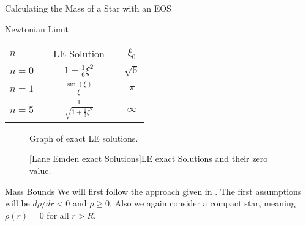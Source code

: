\begin{section}{Calculating the Mass of a Star with an EOS}
\begin{subsection}{Newtonian Limit}
\begin{minipage}{0.45\textwidth}
\begin{tabular}[b]{@{}lcccc@{}}
		\toprule
		$n$ & \phantom{abcd} & \ac{LE} Solution & \phantom{abcd} & $\xi_0$\\
		\cmidrule{1-5}
		$n=0$ && $\displaystyle 1-\frac{1}{6}\xi^2$ && $\sqrt{6}$\\[3ex]
		$n=1$ && $\displaystyle \frac{\sin(\xi)}{\xi}$ && $\pi$\\[3ex]
		$n=5$ && $\displaystyle \frac{1}{\sqrt{1+\frac{1}{3}\xi^2}}$ && $\infty$\\[2ex]
		\bottomrule
	\end{tabular}
\end{minipage}
\begin{minipage}[t]{0.5\textwidth}
	\begin{figure}[H]
		\caption[Graph of exact Lane Emden Solutions]{Graph of exact \ac{LE} solutions.}
		\label{3-Mass-LE-Exact-Results-Plots}
	\end{figure}
\end{minipage}\hfill%
\begin{minipage}[t]{0.45\textwidth}
	\begin{figure}[H]
		[Lane Emden exact Solutions]{\ac{LE} exact Solutions and their zero value.}
		\label{3-Mass-LE-Exact-Results}
	\end{figure}
\end{minipage}
%
%
\end{subsection}
%
%
%
\begin{subsection}{Mass Bounds}
We will first follow the approach given in \cite{waldGeneralRelativity1984}. 
The first assumptions will be $d\rho/dr<0$ and $\rho\geq0$. 
Also we again consider a compact star, meaning $\rho(r)=0$ for all $r>R$.
%
%

\end{subsection}
\end{section}
